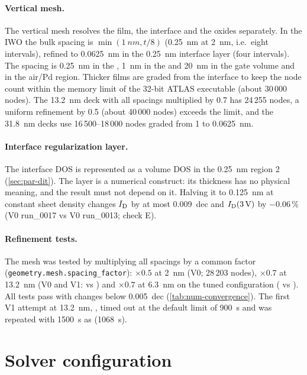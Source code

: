 \paragraph{Vertical mesh.} The vertical mesh resolves the film, the interface and the oxides separately. In the IWO the
bulk spacing is $\min(\SI{1}{nm}, t/8)$ (\SI{0.25}{nm} at \SI{2}{nm}, i.e.\ eight intervals), refined to
\SI{0.0625}{nm} in the \SI{0.25}{nm} interface layer (four intervals). The spacing is \SI{0.25}{nm} in the \AlO{},
\SI{1}{nm} in the \HfO{} and \SI{20}{nm} in the gate volume and in the air/Pd region. Thicker films are graded from the
interface to keep the node count within the memory limit of the 32-bit ATLAS executable (about 30\,000 nodes). The
\SI{13.2}{nm} deck with all spacings multiplied by 0.7 has 24\,255 nodes, a uniform refinement by 0.5 (about 40\,000
nodes) exceeds the limit, and the \SI{31.8}{nm} decks use 16\,500--18\,000 nodes graded from 1 to \SI{0.0625}{nm}.

\paragraph{Interface regularization layer.} The interface DOS is represented as a volume DOS in the \SI{0.25}{nm}
region 2 (\cref{sec:par-dit}). The layer is a numerical construct: its thickness has no physical meaning, and the result
must not depend on it. Halving it to \SI{0.125}{nm} at constant sheet density changes $I_{\mathrm{D}}$ by at most \SI{0.009}{dec}
and $I_{\mathrm{D}}(\SI{3}{V})$ by $-0.06$\,\% (V0 run\_0017 vs V0 run\_0013; check E).

\paragraph{Refinement tests.} The mesh was tested by multiplying all spacings by a common factor
(\texttt{geometry.mesh.spacing\_factor}): $\times 0.5$ at \SI{2}{nm} (V0; 28\,203 nodes), $\times 0.7$ at
\SI{13.2}{nm} (V0 and V1:  vs ) and $\times 0.7$ at \SI{6.3}{nm} on the tuned configuration
( vs ). All tests pass with changes below \SI{0.005}{dec} (\cref{tab:num-convergence}). The first V1
attempt at \SI{13.2}{nm}, , timed out at the default limit of \SI{900}{s} and was repeated with \SI{1500}{s}
as  (\SI{1068}{s}).

\section{Solver configuration}\label{sec:num-solver}


